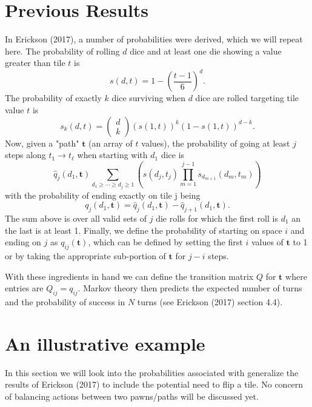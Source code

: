 \documentclass[letterpaper,11pt]{article}
\begin{document}
\section{Previous Results}
In Erickson (2017), a number of probabilities were derived, which we will
repeat here.  The probability of rolling $d$ dice and at least one die showing
a value greater than tile $t$ is
\begin{equation}
	s\left(d,t\right) = 1-\left(\frac{t-1}{6}\right)^d.
\end{equation}
The probability of exactly $k$ dice surviving when $d$ dice are rolled targeting
tile value $t$ is
\begin{equation}
	s_k\left(d,t\right)=\left(
	\begin{array}{c}
		d \\
		k
	\end{array} \right) \left(s\left(1,t\right)\right)^k
	\left(1-s\left(1,t\right)\right)^{d-k}.
\end{equation}
Now, given a "path" $\mathbf{t}$ (an array of $t$ values), the probability of
going at least $j$ steps along $t_1 \rightarrow t_\ell$ when starting with
$d_1$ dice is
\begin{equation}
	\hat{q}_j\left(d_1,\mathbf{t}\right) \sum_{d_1\geq\cdots\geq d_j\geq 1}
	\left( s\left(d_j,t_j\right)
	\prod_{m=1}^{j-1} s_{d_{m+1}}\left(d_m,t_m\right)\right)
\end{equation}
with the probability of ending exactly on tile j being
\begin{equation}
	q_j\left(d_1,\mathbf{t}\right)= \hat{q}_j\left(d_1,\mathbf{t}\right) -
	\hat{q}_{j+1}\left(d_1,\mathbf{t}\right).
\end{equation}
The sum above is over all valid sets of $j$ die rolls for which the first roll
is $d_1$ an the last is at least 1.  Finally, we define the probability of
starting on space $i$ and ending on $j$ as $q_{ij}(\mathbf{t})$, which can be
defined by setting the first $i$ values of $\mathbf{t}$ to 1 or by taking the
appropriate sub-portion of $\mathbf{t}$ for $j-i$ steps.

With these ingredients in hand we can define the transition matrix $Q$ for
$\mathbf{t}$ where entries are $Q_{ij}=q_{ij}$.  Markov theory then predicts
the expected number of turns and the probability of success in $N$ turns (see
Erickson (2017) section 4.4).  

\section{An illustrative example}
In this section we will look into the probabilities associated with  generalize the results of Erickson (2017) to include
the potential need to flip a tile.  No concern of balancing actions between two
pawns/paths will be discussed yet.
\end{document}
